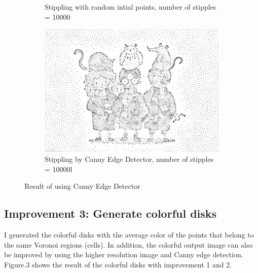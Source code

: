 \documentclass[11pt]{article}
\begin{document}
\begin{figure}[h!]
\begin{subfigure}[b]{0.4\linewidth}
		\caption{Stippling with random intial points, number of stipples = 10000}
	\end{subfigure}
	\begin{subfigure}[b]{0.4\linewidth}
		\includegraphics[width=\linewidth]{harry2_edge.png}
		\caption{Stippling by Canny Edge Detector, number of stipples = 10000l}
	\end{subfigure}
	\caption{Result of using Canny Edge Detector}
	\label{fig:2}
\end{figure}

\subsection{Improvement 3: Generate colorful disks}
I generated the colorful disks with the average color of the points that belong to the same Voronoi regions (cells). In addition, the colorful output image can also be improved by using the higher resolution image and Canny edge detection. Figure.3 shows the result of the colorful disks with improvement 1 and 2.
\end{document}
